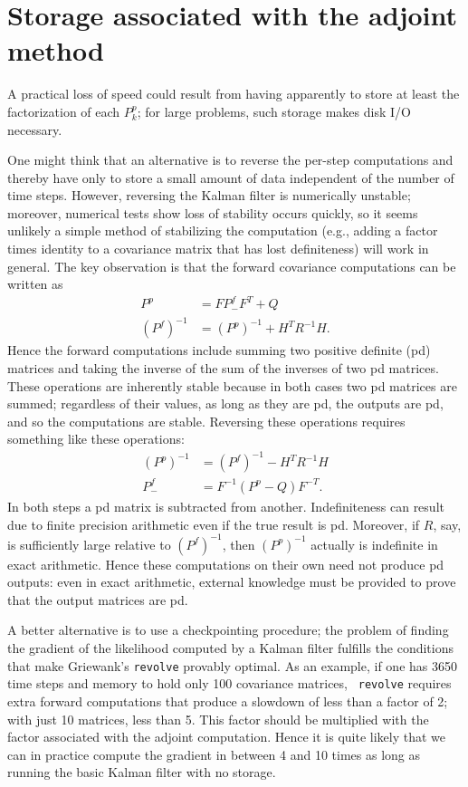 \documentclass[10pt,fleqn]{article}
\begin{document}
\section{Storage associated with the adjoint method}
A practical loss of speed could result from having apparently to store at least
the factorization of each $P^p_k$; for large problems, such storage makes disk
I/O necessary.

One might think that an alternative is to reverse the per-step computations and
thereby have only to store a small amount of data independent of the number of
time steps. However, reversing the Kalman filter is numerically unstable;
moreover, numerical tests show loss of stability occurs quickly, so it seems
unlikely a simple method of stabilizing the computation (e.g., adding a factor
times identity to a covariance matrix that has lost definiteness) will work in
general. The key observation is that the forward covariance computations can be
written as
\begin{align*}
  P^p &= F P^f_- F^T + Q \\
  (P^f)^{-1} &= (P^p)^{-1} + H^T R^{-1} H.
\end{align*}
Hence the forward computations include summing two positive definite (pd)
matrices and taking the inverse of the sum of the inverses of two pd
matrices. These operations are inherently stable because in both cases two pd
matrices are summed; regardless of their values, as long as they are pd, the
outputs are pd, and so the computations are stable. Reversing these operations
requires something like these operations:
\begin{align*}
  (P^p)^{-1} &= (P^f)^{-1} - H^T R^{-1} H \\
  P^f_- &= F^{-1} (P^p - Q) F^{-T}.
\end{align*}
In both steps a pd matrix is subtracted from another. Indefiniteness can result
due to finite precision arithmetic even if the true result is pd. Moreover, if
$R$, say, is sufficiently large relative to $(P^f)^{-1}$, then $(P^p)^{-1}$
actually is indefinite in exact arithmetic. Hence these computations on their
own need not produce pd outputs: even in exact arithmetic, external knowledge
must be provided to prove that the output matrices are pd.

A better alternative is to use a checkpointing procedure; the problem of finding
the gradient of the likelihood computed by a Kalman filter fulfills the
conditions that make Griewank's {\tt revolve} provably optimal. As an example,
if one has 3650 time steps and memory to hold only 100 covariance matrices, {\tt
  revolve} requires extra forward computations that produce a slowdown of less
than a factor of 2; with just 10 matrices, less than 5. This factor should be
multiplied with the factor associated with the adjoint computation. Hence it is
quite likely that we can in practice compute the gradient in between 4 and 10
times as long as running the basic Kalman filter with no storage.
\end{document}

